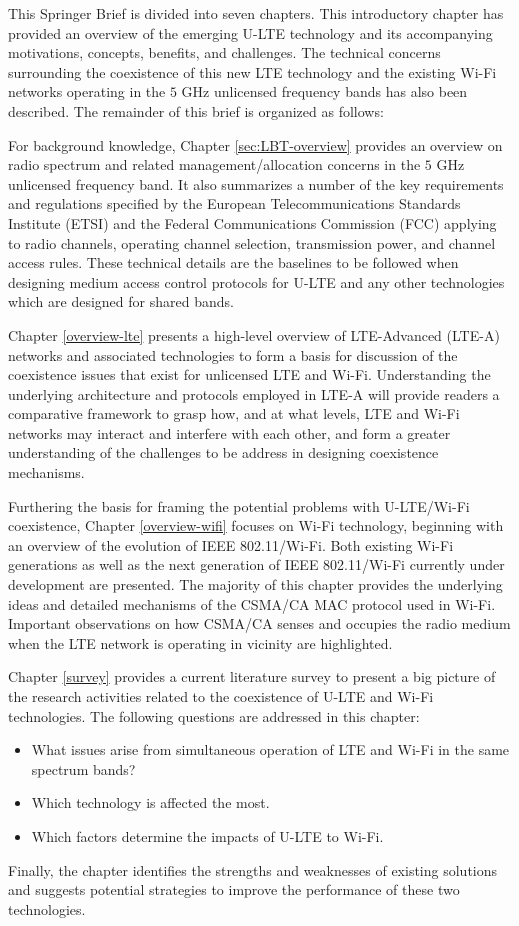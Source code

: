 This Springer Brief is divided into seven chapters. This introductory chapter has provided an overview of the emerging U-LTE technology and its accompanying motivations, concepts, benefits, and challenges. The technical concerns surrounding the coexistence of this new LTE technology and the existing Wi-Fi networks operating in the $5$ GHz unlicensed frequency bands has also been described. The remainder of this brief is organized as follows: 

For background knowledge, Chapter \ref{sec:LBT-overview} provides an overview on radio spectrum and related management/allocation concerns in the $5$ GHz unlicensed frequency band. It also summarizes a number of the key requirements and regulations specified by the European Telecommunications Standards Institute (ETSI) and the Federal Communications Commission (FCC) applying to radio channels, operating channel selection, transmission power, and channel access rules. These technical details are the baselines to be followed when designing medium access control protocols for U-LTE and any other technologies which are designed for shared bands.

Chapter \ref{overview-lte} presents a high-level overview of LTE-Advanced (LTE-A) networks and associated technologies to form a basis for discussion of the coexistence issues that exist for unlicensed LTE and Wi-Fi. Understanding the underlying architecture and protocols employed in LTE-A will provide readers a comparative framework to grasp how, and at what levels, LTE and Wi-Fi networks may interact and interfere with each other, and form a greater understanding of the challenges to be address in designing coexistence mechanisms.

Furthering the basis for framing the potential problems with U-LTE/Wi-Fi coexistence, Chapter \ref{overview-wifi} focuses on Wi-Fi technology, beginning with an overview of the evolution of IEEE 802.11/Wi-Fi. Both existing Wi-Fi generations as well as the next generation of IEEE 802.11/Wi-Fi currently under development are presented. The majority of this chapter provides the underlying ideas and detailed mechanisms of the CSMA/CA MAC protocol used in Wi-Fi. Important observations on how CSMA/CA senses and occupies the radio medium when the LTE network is operating in vicinity are highlighted.

Chapter \ref{survey} provides a current literature survey to present a big picture of the research activities related to the coexistence of U-LTE and Wi-Fi technologies. The following questions are addressed in this chapter: 
\begin{itemize}
\item What issues arise from simultaneous operation of LTE and Wi-Fi in the same spectrum bands? 
\item Which technology is affected the most. 
\item Which factors determine the impacts of U-LTE to Wi-Fi. 
\end{itemize}Finally, the chapter identifies the strengths and weaknesses of existing solutions and suggests potential strategies to improve the performance of these two technologies.

